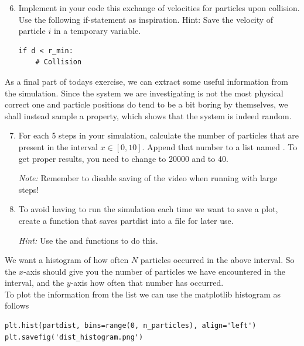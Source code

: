 \documentclass{article}
\begin{document}
\begin{enumerate}
  \setcounter{enumi}{5}
  \item Implement in your code this exchange of velocities for particles upon collision.
      Use the following if-statement as inspiration.
      {Hint:} Save the velocity of particle $i$ in a temporary variable.

\begin{lstlisting}
if d < r_min:
    # Collision
\end{lstlisting}

\end{enumerate}

As a final part of todays exercise, we can extract some useful information from the simulation.
Since the system we are investigating is not the most physical correct one and particle positions do tend to be a bit boring by themselves, we shall instead sample a property, which shows that the system is indeed random.

\begin{enumerate}
  \setcounter{enumi}{6}
  \item For each 5 steps in your simulation, calculate the number of particles
    that are present in the interval $x \in [0, 10]$.
    Append that number to a list named .
    To get proper results, you need to change  to 20000 and  to 40.

    {\em Note:} Remember to disable saving of the video when running with large steps!

    \item To avoid having to run the simulation each time we want to save a plot, create a function that saves partdist into a file for later use.

    {\em Hint:} Use the  and  functions to do this.

\end{enumerate}


We want a histogram of how often $N$ particles occurred in the above interval.
So the $x$-axis should give you the number of particles we have encountered in the interval, and the $y$-axis how often that number has occurred.\\

To plot the information from the list we can use the matplotlib histogram as follows

\begin{lstlisting}
plt.hist(partdist, bins=range(0, n_particles), align='left')
plt.savefig('dist_histogram.png')
\end{lstlisting}
\end{document}
